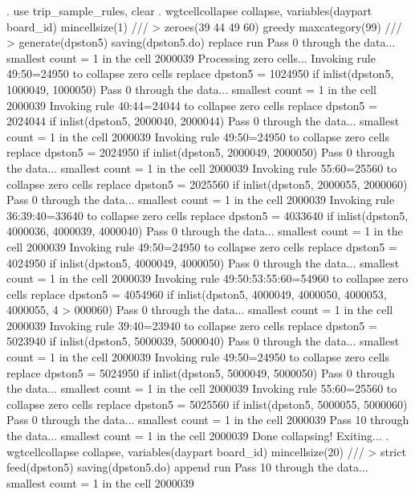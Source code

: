 . use trip_sample_rules, clear
{\smallskip}
. wgtcellcollapse collapse, variables(daypart board_id) mincellsize(1) ///
>         zeroes(39 44 49 60) greedy maxcategory(99) ///
>         generate(dpston5) saving(dpston5.do) replace run
Pass 0 through the data...
  smallest count = 1 in the cell      2000039
{\smallskip}
Processing zero cells...
{\smallskip}
  Invoking rule 49:50=24950 to collapse zero cells
  replace dpston5 = 1024950 if inlist(dpston5, 1000049, 1000050)
Pass 0 through the data...
  smallest count = 1 in the cell      2000039
  Invoking rule 40:44=24044 to collapse zero cells
  replace dpston5 = 2024044 if inlist(dpston5, 2000040, 2000044)
Pass 0 through the data...
  smallest count = 1 in the cell      2000039
  Invoking rule 49:50=24950 to collapse zero cells
  replace dpston5 = 2024950 if inlist(dpston5, 2000049, 2000050)
Pass 0 through the data...
  smallest count = 1 in the cell      2000039
  Invoking rule 55:60=25560 to collapse zero cells
  replace dpston5 = 2025560 if inlist(dpston5, 2000055, 2000060)
Pass 0 through the data...
  smallest count = 1 in the cell      2000039
  Invoking rule 36:39:40=33640 to collapse zero cells
  replace dpston5 = 4033640 if inlist(dpston5, 4000036, 4000039, 4000040)
Pass 0 through the data...
  smallest count = 1 in the cell      2000039
  Invoking rule 49:50=24950 to collapse zero cells
  replace dpston5 = 4024950 if inlist(dpston5, 4000049, 4000050)
Pass 0 through the data...
  smallest count = 1 in the cell      2000039
  Invoking rule 49:50:53:55:60=54960 to collapse zero cells
  replace dpston5 = 4054960 if inlist(dpston5, 4000049, 4000050, 4000053, 4000055, 4
> 000060)
Pass 0 through the data...
  smallest count = 1 in the cell      2000039
  Invoking rule 39:40=23940 to collapse zero cells
  replace dpston5 = 5023940 if inlist(dpston5, 5000039, 5000040)
Pass 0 through the data...
  smallest count = 1 in the cell      2000039
  Invoking rule 49:50=24950 to collapse zero cells
  replace dpston5 = 5024950 if inlist(dpston5, 5000049, 5000050)
Pass 0 through the data...
  smallest count = 1 in the cell      2000039
  Invoking rule 55:60=25560 to collapse zero cells
  replace dpston5 = 5025560 if inlist(dpston5, 5000055, 5000060)
Pass 0 through the data...
  smallest count = 1 in the cell      2000039
Pass 10 through the data...
  smallest count = 1 in the cell      2000039
  Done collapsing! Exiting...
{\smallskip}
. wgtcellcollapse collapse, variables(daypart board_id) mincellsize(20) ///
>         strict feed(dpston5) saving(dpston5.do) append run
Pass 10 through the data...
  smallest count = 1 in the cell      2000039
